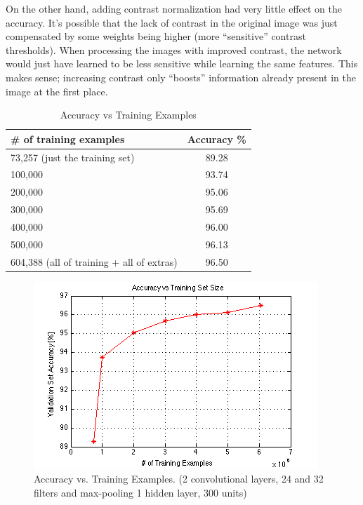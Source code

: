 \documentclass{article} %
\begin{document}
On the other hand, adding contrast normalization had very little effect on the accuracy. It’s possible that the lack of contrast in the original image was just compensated by some weights being higher (more “sensitive” contrast thresholds). When processing the images with improved contrast, the network would just have learned to be less sensitive while learning the same features. This makes sense; increasing contrast only “boosts” information already present in the image at the first place\cite{lenet5}.


\begin{center}
	\begin{table}[!h]
		  \begin{tabular}{ | l || c ||}
		    \hline
		    \# of training examples & Accuracy \% \\ \hline \hline
		    73,257 (just the training set) & 89.28 \\ \hline
		    100,000 & 93.74 \\ \hline
		    200,000 & 95.06 \\ \hline
		    300,000 & 95.69 \\ \hline
		    400,000 & 96.00 \\ \hline
		    500,000 & 96.13 \\ \hline
		    604,388 (all of training + all of extras) & 96.50 \\ \hline
		  \end{tabular}
	  \caption{Accuracy vs Training Examples}
	  \label{table:train}
	\end{table}
\end{center}

\begin{center}
\begin{figure}[!htb]
  \includegraphics[width=0.8\linewidth]{images/image05}
  \caption{Accuracy vs. Training Examples. (2 convolutional layers, 24 and 32 filters and max-pooling 1 hidden layer, 300 units)}
  \label{fig:accuracy}
\end{figure}
\end{center}
\end{document}
